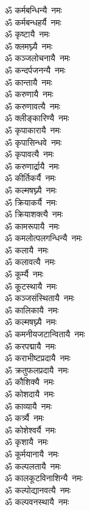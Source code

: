 \begin{flushleft}
\begin{multicols}{2}
ॐ कर्मबन्धिन्यै~नमः\hfill{}\\
ॐ कर्मबन्धहर्यै~नमः\\
ॐ कृष्टायै~नमः\\
ॐ क्लमघ्न्यै~नमः\\
ॐ कञ्जलोचनायै~नमः\\
ॐ कन्दर्पजनन्यै~नमः\\
ॐ कान्तायै~नमः\\
ॐ करुणायै~नमः\\
ॐ करुणावत्यै~नमः\\
ॐ क्लीङ्कारिण्यै~नमः\\
ॐ कृपाकारायै~नमः\hfill{}\\
ॐ कृपासिन्धवे~नमः\\
ॐ कृपावत्यै~नमः\\
ॐ करुणार्द्रायै~नमः\\
ॐ कीर्तिकर्यै~नमः\\
ॐ कल्मषघ्न्यै~नमः\\
ॐ क्रियाकर्यै~नमः\\
ॐ क्रियाशक्त्यै~नमः\\
ॐ कामरूपायै~नमः\\
ॐ कमलोत्पलगन्धिन्यै~नमः\\
ॐ कलायै~नमः\hfill{}\\
ॐ कलावत्यै~नमः\\
ॐ कूर्म्यै~नमः\\
ॐ कूटस्थायै~नमः\\
ॐ कञ्जसंस्थितायै~नमः\\
ॐ कालिकायै~नमः\\
ॐ कल्मषघ्न्यै~नमः\\
ॐ कमनीयजटान्वितायै~नमः\\
ॐ करपद्मायै~नमः\\
ॐ कराभीष्टप्रदायै~नमः\\
ॐ क्रतुफलप्रदायै~नमः\hfill{}\\
ॐ कौशिक्यै~नमः\\
ॐ कोशदायै~नमः\\
ॐ काव्यायै~नमः\\
ॐ कर्त्र्यै~नमः\\
ॐ कोशेश्वर्यै~नमः\\
ॐ कृशायै~नमः\\
ॐ कूर्मयानायै~नमः\\
ॐ कल्पलतायै~नमः\\
ॐ कालकूटविनाशिन्यै~नमः\\
ॐ कल्पोद्यानवत्यै~नमः\hfill{}\\
ॐ कल्पवनस्थायै~नमः\\

\end{multicols}
\end{flushleft}
